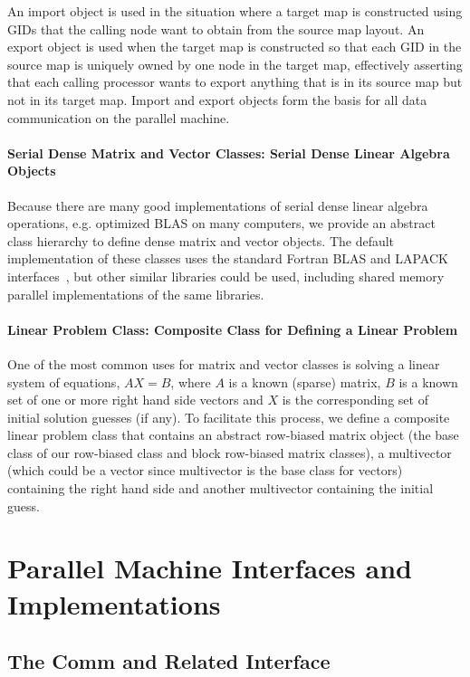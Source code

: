 \documentclass[12pt,relax]{PetraObjectModel}
\begin{document}
An import object is used in the situation where a target map is constructed using GIDs 
that the calling node want to obtain from the source map layout.  An export object is 
used when the target map is constructed so that each GID in the source map is uniquely 
owned by one node in the target map, effectively asserting that each calling processor 
wants to export anything that is in its source map but not in its target map.  Import 
and export objects form the basis for all data communication on the parallel machine.

\paragraph{Serial Dense Matrix and Vector Classes:  Serial Dense Linear Algebra Objects}

Because there are many good implementations of serial dense linear algebra operations, 
e.g. optimized BLAS on many computers, we provide an abstract class hierarchy to define 
dense matrix and vector objects.  The default implementation of these classes uses the 
standard Fortran BLAS and LAPACK interfaces~\cite{BLAS1,BLAS2,BLAS3,LAPACK}, 
but other similar libraries could be 
used, including shared memory parallel implementations of the same libraries.

\paragraph{Linear Problem Class:  Composite Class for Defining a Linear Problem}

One of the most common uses for matrix and vector classes is solving a linear system of 
equations, $AX = B$, where $A$ is a known (sparse) matrix, $B$ is a known set of one or 
more right hand side vectors and $X$ is the corresponding set of initial solution 
guesses (if any).  To facilitate this process, we define a composite linear problem 
class that contains an abstract row-biased matrix object (the base class of our 
row-biased class and block row-biased matrix classes), a multivector (which could be a 
vector since multivector is the base class for vectors) containing the right hand side 
and another multivector containing the initial guess.

\section{Parallel Machine Interfaces and Implementations}

\subsection{The Comm and Related Interface}
\end{document}
